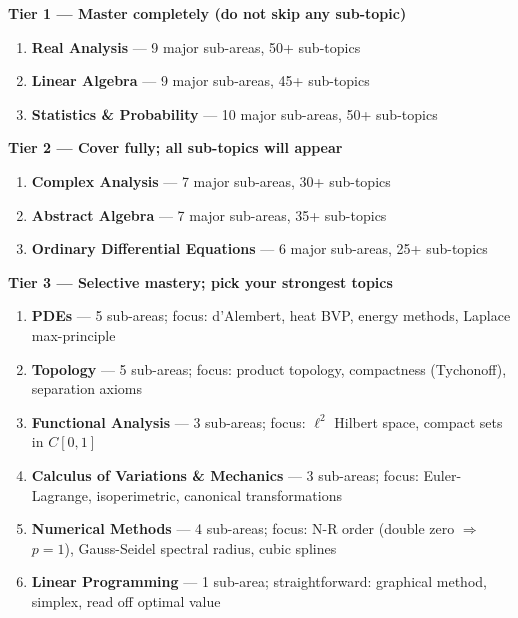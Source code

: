 \documentclass[11pt,a4paper]{article}
\begin{document}
\newpage

\begin{tcolorbox}[enhanced, breakable,
  colback=C1!6, colframe=C1, boxrule=1pt, arc=6pt,
  title={\textbf{Complete Preparation Priority Map}},
  fonttitle=\bfseries\color{white},
  attach boxed title to top left={yshift=-3mm, xshift=6mm},
  boxed title style={colback=C1, arc=4pt}
]

\textbf{Tier 1 — Master completely (do not skip any sub-topic)}
\begin{enumerate}[leftmargin=1.5em,itemsep=2pt]
  \item \textbf{Real Analysis} --- 9 major sub-areas, 50+ sub-topics
  \item \textbf{Linear Algebra} --- 9 major sub-areas, 45+ sub-topics
  \item \textbf{Statistics \& Probability} --- 10 major sub-areas, 50+ sub-topics
\end{enumerate}

\medskip
\textbf{Tier 2 — Cover fully; all sub-topics will appear}
\begin{enumerate}[leftmargin=1.5em,itemsep=2pt,start=4]
  \item \textbf{Complex Analysis} --- 7 major sub-areas, 30+ sub-topics
  \item \textbf{Abstract Algebra} --- 7 major sub-areas, 35+ sub-topics
  \item \textbf{Ordinary Differential Equations} --- 6 major sub-areas, 25+ sub-topics
\end{enumerate}

\medskip
\textbf{Tier 3 — Selective mastery; pick your strongest topics}
\begin{enumerate}[leftmargin=1.5em,itemsep=2pt,start=7]
  \item \textbf{PDEs} --- 5 sub-areas; focus: d'Alembert, heat BVP, energy methods, Laplace max-principle
  \item \textbf{Topology} --- 5 sub-areas; focus: product topology, compactness (Tychonoff), separation axioms
  \item \textbf{Functional Analysis} --- 3 sub-areas; focus: $\ell^2$ Hilbert space, compact sets in $C[0,1]$
  \item \textbf{Calculus of Variations \& Mechanics} --- 3 sub-areas; focus: Euler-Lagrange, isoperimetric, canonical transformations
  \item \textbf{Numerical Methods} --- 4 sub-areas; focus: N-R order (double zero $\Rightarrow$ $p=1$), Gauss-Seidel spectral radius, cubic splines
  \item \textbf{Linear Programming} --- 1 sub-area; straightforward: graphical method, simplex, read off optimal value
\end{enumerate}


\end{tcolorbox}
\end{document}
